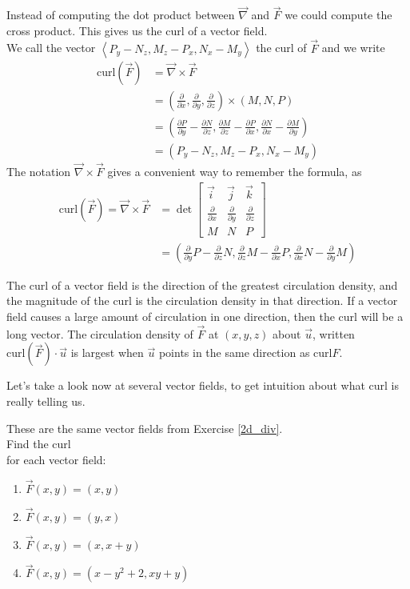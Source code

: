 Instead of computing the dot product between $\vec \nabla$ and $\vec F$ we could compute the cross product. This gives us the curl of a vector field.\\

We call the vector $\left<P_y-N_z,M_z-P_x,N_x-M_y\right>$ the curl of $\vec F$ and we write 
\begin{align*}
\text{curl}(\vec F) 
&= \vec \nabla \times \vec F \\
&= \left(\frac{\partial}{\partial x},\frac{\partial}{\partial y},\frac{\partial}{\partial z}\right) \times (M,N,P) \\
&= \left(\frac{\partial P}{\partial y}-\frac{\partial N}{\partial z}, \frac{\partial M}{\partial z}-\frac{\partial P}{\partial x},\frac{\partial N}{\partial x}-\frac{\partial M}{\partial y}\right) \\
&=  \left(P_y-N_z,M_z-P_x,N_x-M_y\right) 
\end{align*}
  The notation $\vec \nabla \times \vec F $ gives a convenient way to remember the formula, as 
\begin{align*}
\text{curl}(\vec F)=\vec \nabla \times \vec F 
&=\det \begin{bmatrix}
\vec i & \vec j & \vec k\\
\frac{\partial}{\partial x}&\frac{\partial}{\partial y}&\frac{\partial}{\partial z}\\
M&N&P
\end{bmatrix} 
\\&= \left(\frac{\partial}{\partial y}P-\frac{\partial}{\partial z}N,\frac{\partial}{\partial z}M-\frac{\partial}{\partial x}P,\frac{\partial}{\partial x}N-\frac{\partial}{\partial y}M\right)
\end{align*}
\begin{theorem}
The curl of a vector field is the direction of the greatest circulation density, and the magnitude of the curl is the circulation density in that direction. If a vector field causes a large amount of circulation in one direction, then the curl will be a long vector. The circulation density of $\vec F$ at $(x,y,z)$ about $\vec u$, written $\text{curl}(\vec F)\cdot \vec u$ is largest when $\vec u$ points in the same direction as $\text{curl} F$. 
\end{theorem}

Let's take a look now at several vector fields, to get intuition about what curl is really telling us.
\begin{problem}\label{2dcurl}
These are the same vector fields from Exercise \ref{2d_div}.\\
Find the curl\\  for each vector field:
\begin{enumerate}
\item $\vec{F}(x,y)=(x,y)$
\item $\vec{F}(x,y)=(y,x)$
\item $\vec{F}(x,y)=(x,x+y)$
\item $\vec{F}(x,y)=(x-y^2+2, xy+y)$
\end{enumerate}
\end{problem}

